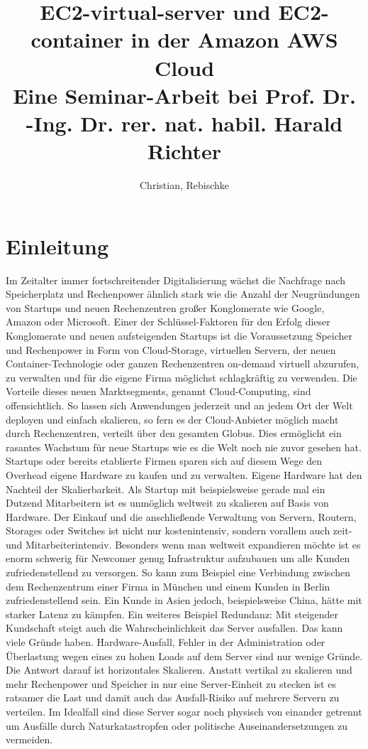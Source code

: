 \documentclass[titlepage]{report}
\title{EC2-virtual-server und EC2-container in der Amazon AWS Cloud \\
\large Eine Seminar-Arbeit bei Prof. Dr. -Ing. Dr. rer. nat. habil.
Harald Richter}
\author{Christian, Rebischke}
\begin{document}
\maketitle
\tableofcontents
\newpage
\chapter{Einleitung}
Im Zeitalter immer fortschreitender Digitalisierung wächst die Nachfrage
nach Speicherplatz und Rechenpower ähnlich stark wie die Anzahl der
Neugründungen von Startups und neuen Rechenzentren großer Konglomerate
wie Google, Amazon oder Microsoft. Einer der Schlüssel-Faktoren für den Erfolg
dieser Konglomerate und neuen aufsteigenden Startups ist die
Voraussetzung Speicher und Rechenpower in Form von Cloud-Storage,
virtuellen Servern, der neuen Container-Technologie oder ganzen Rechenzentren
on-demand virtuell abzurufen, zu verwalten und für die eigene Firma
möglichst schlagkräftig zu verwenden. Die Vorteile dieses neuen Marktsegments,
genannt Cloud-Computing, sind offensichtlich. So lassen sich Anwendungen
jederzeit und an jedem Ort der Welt deployen und einfach skalieren, so
fern es der Cloud-Anbieter möglich macht durch Rechenzentren, verteilt
über den gesamten Globus. Dies ermöglicht ein rasantes Wachstum für neue
Startups wie es die Welt noch nie zuvor gesehen hat. Startups oder
bereits etablierte Firmen sparen sich auf diesem Wege den Overhead
eigene Hardware zu kaufen und zu verwalten. Eigene Hardware hat den
Nachteil der Skalierbarkeit. Als Startup mit beispielsweise gerade mal ein Dutzend
Mitarbeitern ist es unmöglich weltweit zu skalieren auf Basis von
Hardware. Der Einkauf und die anschließende Verwaltung von Servern,
Routern, Storages oder Switches ist nicht nur kostenintensiv, sondern
vorallem auch zeit- und Mitarbeiterintensiv. Besonders wenn man weltweit
expandieren möchte ist es enorm schwerig für Newcomer genug
Infrastruktur aufzubauen um alle Kunden zufriedenstellend zu versorgen.
So kann zum Beispiel eine Verbindung zwischen dem Rechenzentrum einer
Firma in München und einem Kunden in Berlin zufriedenstellend sein. Ein
Kunde in Asien jedoch, beispielsweise China, hätte mit starker Latenz zu
kämpfen. Ein weiteres Beispiel Redundanz: Mit steigender Kundschaft
steigt auch die Wahrscheinlichkeit das Server ausfallen. Das kann viele
Gründe haben. Hardware-Ausfall, Fehler in der Administration oder
Überlastung wegen eines zu hohen Loads auf dem Server sind nur wenige
Gründe. Die Antwort darauf ist horizontales Skalieren. Anstatt vertikal
zu skalieren und mehr Rechenpower und Speicher in nur eine
Server-Einheit zu stecken ist es ratsamer die Last und damit auch das
Ausfall-Risiko auf mehrere Servern zu verteilen. Im Idealfall sind diese
Server sogar noch physisch von einander getrennt um Ausfälle durch
Naturkatastropfen oder politische Auseinandersetzungen zu vermeiden.
\newpage
\end{document}
